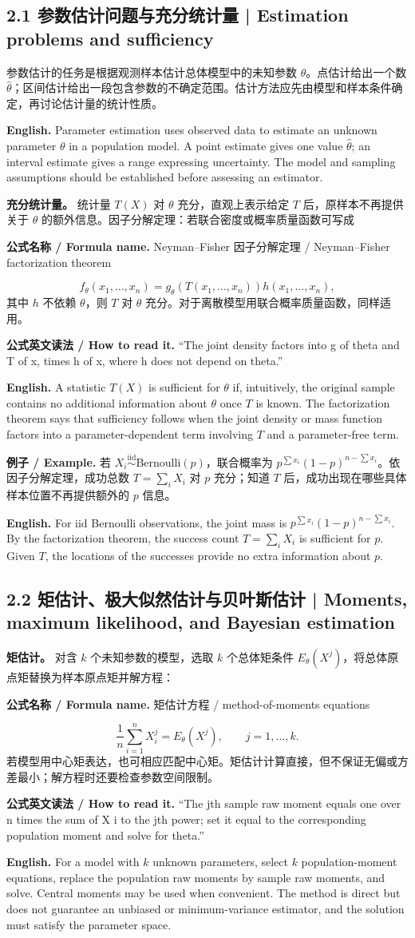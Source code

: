 \documentclass[UTF8,11pt,a4paper]{ctexart}
\newcommand{\EN}[1]{\par\noindent\textbf{English.} #1\par}
\newcommand{\READ}[1]{\par\noindent\textbf{公式英文读法 / How to read it.} #1\par}
\newcommand{\FORMULA}[2]{\par\noindent\textbf{公式名称 / Formula name.} #1 / #2\par}
\newcommand{\EX}[2]{\par\noindent\textbf{例子 / Example.} #1\par\EN{#2}}
\begin{document}
\subsection*{2.1 参数估计问题与充分统计量 | Estimation problems and sufficiency}
\noindent 参数估计的任务是根据观测样本估计总体模型中的未知参数 $\theta$。点估计给出一个数 $\hat\theta$；区间估计给出一段包含参数的不确定范围。估计方法应先由模型和样本条件确定，再讨论估计量的统计性质。
\EN{Parameter estimation uses observed data to estimate an unknown parameter $\theta$ in a population model. A point estimate gives one value $\hat\theta$; an interval estimate gives a range expressing uncertainty. The model and sampling assumptions should be established before assessing an estimator.}

\noindent\textbf{充分统计量。} 统计量 $T(X)$ 对 $\theta$ 充分，直观上表示给定 $T$ 后，原样本不再提供关于 $\theta$ 的额外信息。因子分解定理：若联合密度或概率质量函数可写成
\FORMULA{Neyman--Fisher 因子分解定理}{Neyman--Fisher factorization theorem}
\[
f_\theta(x_1,\ldots,x_n)=g_\theta(T(x_1,\ldots,x_n))h(x_1,\ldots,x_n),
\]
其中 $h$ 不依赖 $\theta$，则 $T$ 对 $\theta$ 充分。对于离散模型用联合概率质量函数，同样适用。
\READ{“The joint density factors into g of theta and T of x, times h of x, where h does not depend on theta.”}
\EN{A statistic $T(X)$ is sufficient for $\theta$ if, intuitively, the original sample contains no additional information about $\theta$ once $T$ is known. The factorization theorem says that sufficiency follows when the joint density or mass function factors into a parameter-dependent term involving $T$ and a parameter-free term.}

\EX{若 $X_i\overset{\mathrm{iid}}{\sim}\mathrm{Bernoulli}(p)$，联合概率为 $p^{\sum x_i}(1-p)^{n-\sum x_i}$。依因子分解定理，成功总数 $T=\sum_iX_i$ 对 $p$ 充分；知道 $T$ 后，成功出现在哪些具体样本位置不再提供额外的 $p$ 信息。}{For iid Bernoulli observations, the joint mass is $p^{\sum x_i}(1-p)^{n-\sum x_i}$. By the factorization theorem, the success count $T=\sum_iX_i$ is sufficient for $p$. Given $T$, the locations of the successes provide no extra information about $p$.}

\subsection*{2.2 矩估计、极大似然估计与贝叶斯估计 | Moments, maximum likelihood, and Bayesian estimation}
\noindent\textbf{矩估计。} 对含 $k$ 个未知参数的模型，选取 $k$ 个总体矩条件 $E_\theta(X^j)$，将总体原点矩替换为样本原点矩并解方程：
\FORMULA{矩估计方程}{method-of-moments equations}
\[
\frac1n\sum_{i=1}^nX_i^j=E_\theta(X^j),\qquad j=1,\ldots,k.
\]
若模型用中心矩表达，也可相应匹配中心矩。矩估计计算直接，但不保证无偏或方差最小；解方程时还要检查参数空间限制。
\READ{“The jth sample raw moment equals one over n times the sum of X i to the jth power; set it equal to the corresponding population moment and solve for theta.”}
\EN{For a model with $k$ unknown parameters, select $k$ population-moment equations, replace the population raw moments by sample raw moments, and solve. Central moments may be used when convenient. The method is direct but does not guarantee an unbiased or minimum-variance estimator, and the solution must satisfy the parameter space.}
\end{document}
